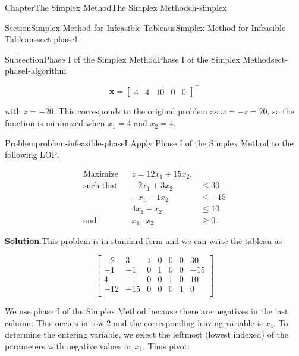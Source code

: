 \documentclass[oneside,10pt,]{book}
\newcommand{\blocktitlefont}{\relax}
\numberwithin{equation}{section}
\newcommand{\amp}{&}
\begin{document}
\begin{chapterptx}{Chapter}{The Simplex Method}{}{The Simplex Method}{}{}{ch-simplex}
\begin{sectionptx}{Section}{Simplex Method for Infeasible Tableaus}{}{Simplex Method for Infeasible Tableaus}{}{}{sect-phase1}
\begin{subsectionptx}{Subsection}{Phase I of the Simplex Method}{}{Phase I of the Simplex Method}{}{}{sect-phaseI-algorithm}
\par
%
\begin{equation*}
\boldsymbol{x} = \left[\begin{array}{rr|rrr}  4\amp 4 \amp 10 \amp 0 \amp 0 \end{array} \right]^{\intercal}
\end{equation*}
%
\par
with \(z = -20\). This corresponds to the original problem as \(w = -z = 20\), so the function is minimized when \(x_1=4\) and \(x_2 = 4\).%
\begin{problem}{Problem}{}{problem-infeasible-phaseI}%
Apply Phase I of the Simplex Method to the following LOP.%
\par
%
\begin{equation*}
\begin{aligned} \text{Maximize}\amp \amp z = 12x_1 + 15x_2, \amp \\ \text{such that}\amp \amp -2x_1 + 3x_2 \amp \leq 30 \\ \amp \amp -x_1 -1x_2 \amp \leq -15 \\ \amp \amp 4x_1 - x_2 \amp \leq 10 \\ \text{and} \amp \amp x_1,\; x_2 \amp \geq 0.
\end{aligned}
\end{equation*}
%
\par\smallskip%
\noindent\textbf{\blocktitlefont Solution}.\hypertarget{problem-infeasible-phaseI-2}{}\quad{}This problem is in standard form and we can write the tableau as%
\par
%
\begin{equation}
\left[\begin{array}{rr|rrrr|r} -2 \amp 3 \amp 1 \amp 0 \amp 0 \amp 0 \amp 30\\ -1 \amp -1 \amp 0 \amp 1 \amp 0 \amp 0 \amp -15\\ 4 \amp -1 \amp 0 \amp 0 \amp 1 \amp 0 \amp 10\\ \hline -12 \amp -15 \amp 0 \amp 0 \amp 0 \amp 1 \amp 0\\ \end{array} \right]\label{eq-phaseI-lop0}
\end{equation}
%
\par
We use phase I of the Simplex Method because there are negatives in the last column. This occurs in row 2 and the corresponding leaving variable is \(x_4\). To determine the entering variable, we select the leftmost (lowest indexed) of the parameters with negative values or \(x_1\). Thus pivot:%
\par

\end{problem}
\end{subsectionptx}
\end{sectionptx}
\end{chapterptx}
\end{document}
